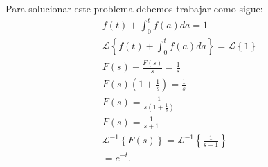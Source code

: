 \documentclass[12pt]{exam}
\newcommand{\La}{\mathscr{L}}
\begin{document}
\begin{enumerate}
    Para solucionar este problema debemos trabajar como sigue:
    \begin{align*}
      f\left( t \right) + \int_0^{t}f\left( a \right) da = 1\\
      \La\left\{ f\left( t \right) + \int_0^{t} f\left( a \right) da \right\} = \La\left\{ 1 \right\} \\
      F\left( s \right) + \frac{F\left( s \right) }{s} = \frac{1}{s}\\
      F\left( s \right) \left( 1+\frac{1}{s} \right) = \frac{1}{s}\\
      F\left( s \right) = \frac{1}{s\left( 1+\frac{1}{s} \right) }\\
      F\left( s \right) =\frac{1}{s+1}\\
      \La^{-1}\left\{ F\left( s \right)  \right\} = \La^{-1}\left\{ \frac{1}{s+1} \right\} \\
      = e^{-t}
    .\end{align*}
\end{enumerate}
\end{document}
